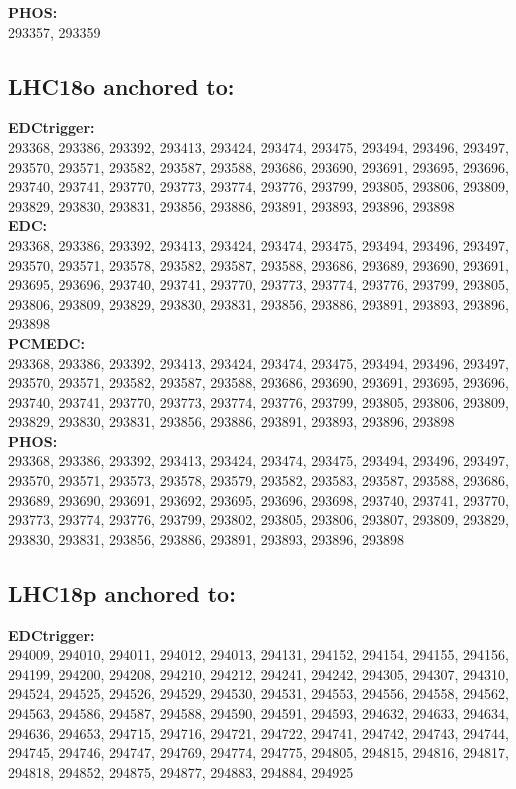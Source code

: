  \textbf{PHOS:}\\
293357, 293359\\

 \subsection{LHC18o anchored to:  }

 \textbf{EDCtrigger:}\\
 293368, 293386, 293392, 293413, 293424, 293474, 293475, 293494, 293496, 293497, 293570, 293571, 293582, 293587, 293588, 293686, 293690, 293691, 293695, 293696, 293740, 293741, 293770, 293773, 293774, 293776, 293799, 293805, 293806, 293809, 293829, 293830, 293831, 293856, 293886, 293891, 293893, 293896, 293898\\

 \textbf{EDC:}\\
 293368, 293386, 293392, 293413, 293424, 293474, 293475, 293494, 293496, 293497, 293570, 293571, 293578, 293582, 293587, 293588, 293686, 293689, 293690, 293691, 293695, 293696, 293740, 293741, 293770, 293773, 293774, 293776, 293799, 293805, 293806, 293809, 293829, 293830, 293831, 293856, 293886, 293891, 293893, 293896, 293898\\

 \textbf{PCMEDC:}\\
 293368, 293386, 293392, 293413, 293424, 293474, 293475, 293494, 293496, 293497, 293570, 293571, 293582, 293587, 293588, 293686, 293690, 293691, 293695, 293696, 293740, 293741, 293770, 293773, 293774, 293776, 293799, 293805, 293806, 293809, 293829, 293830, 293831, 293856, 293886, 293891, 293893, 293896, 293898 \\

 \textbf{PHOS:}\\
293368, 293386, 293392, 293413, 293424, 293474, 293475, 293494, 293496, 293497, 293570, 293571, 293573, 293578, 293579, 293582, 293583, 293587, 293588, 293686, 293689, 293690, 293691, 293692, 293695, 293696, 293698, 293740, 293741, 293770, 293773, 293774, 293776, 293799, 293802, 293805, 293806, 293807, 293809, 293829, 293830, 293831, 293856, 293886, 293891, 293893, 293896, 293898\\

 \subsection{LHC18p anchored to:  }

 \textbf{EDCtrigger:}\\
 294009, 294010, 294011, 294012, 294013, 294131, 294152, 294154, 294155, 294156, 294199, 294200, 294208, 294210, 294212, 294241, 294242, 294305, 294307, 294310, 294524, 294525, 294526, 294529, 294530, 294531, 294553, 294556, 294558, 294562, 294563, 294586, 294587, 294588, 294590, 294591, 294593, 294632, 294633, 294634, 294636, 294653, 294715, 294716, 294721, 294722, 294741, 294742, 294743, 294744, 294745, 294746, 294747, 294769, 294774, 294775, 294805, 294815, 294816, 294817, 294818, 294852, 294875, 294877, 294883, 294884, 294925 \\

